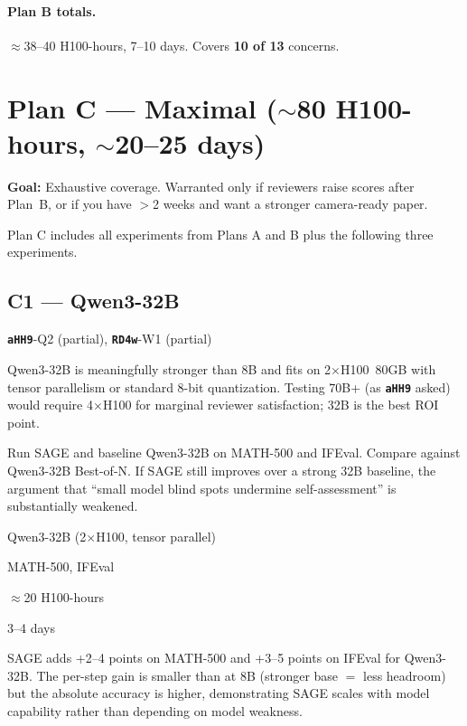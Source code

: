 \documentclass[11pt,a4paper]{article}
\newcommand{\rev}[1]{\texttt{\textbf{#1}}}
\begin{document}
\paragraph{Plan B totals.} $\approx$38--40 H100-hours, 7--10 days. Covers \textbf{10 of 13} concerns.

\section{Plan C --- Maximal ($\sim$80 H100-hours, $\sim$20--25 days)}

\textbf{Goal:} Exhaustive coverage. Warranted only if reviewers raise scores after Plan~B,
or if you have $>$2 weeks and want a stronger camera-ready paper.

Plan C includes all experiments from Plans A and B plus the following three experiments.

\subsection*{C1 --- Qwen3-32B}

\begin{description}[leftmargin=2cm, style=nextline]
  \item[Covers] \rev{aHH9}-Q2 (partial), \rev{RD4w}-W1 (partial)
  \item[Rationale] Qwen3-32B is meaningfully stronger than 8B and fits on 2$\times$H100~80GB
    with tensor parallelism or standard 8-bit quantization. Testing 70B+ (as \rev{aHH9} asked)
    would require 4$\times$H100 for marginal reviewer satisfaction; 32B is the best ROI point.
  \item[Procedure] Run SAGE and baseline Qwen3-32B on MATH-500 and IFEval. Compare against
    Qwen3-32B Best-of-N. If SAGE still improves over a strong 32B baseline, the argument
    that ``small model blind spots undermine self-assessment'' is substantially weakened.
  \item[Model] Qwen3-32B (2$\times$H100, tensor parallel)
  \item[Benchmarks] MATH-500, IFEval
  \item[GPU estimate] $\approx$20 H100-hours
  \item[Wall-clock] 3--4 days
  \item[Expected outcome] SAGE adds +2--4 points on MATH-500 and +3--5 points on IFEval for
    Qwen3-32B. The per-step gain is smaller than at 8B (stronger base $=$ less headroom) but
    the absolute accuracy is higher, demonstrating SAGE scales with model capability rather
    than depending on model weakness.
\end{description}
\end{document}
